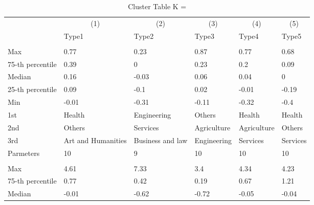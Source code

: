 \begin{table}
\centering
\caption{Cluster Table K = }
\centering
\begin{threeparttable}
\begin{tabular}[t]{llllll}
\toprule
\multicolumn{1}{c}{ } & \multicolumn{1}{c}{(1)} & \multicolumn{1}{c}{(2)} & \multicolumn{1}{c}{(3)} & \multicolumn{1}{c}{(4)} & \multicolumn{1}{c}{(5)} \\
\cmidrule(l{3pt}r{3pt}){2-2} \cmidrule(l{3pt}r{3pt}){3-3} \cmidrule(l{3pt}r{3pt}){4-4} \cmidrule(l{3pt}r{3pt}){5-5} \cmidrule(l{3pt}r{3pt}){6-6}
 & Type1 & Type2 & Type3 & Type4 & Type5\\
\midrule
\addlinespace[0.3em]
\multicolumn{6}{l}{\textit{\textbf{Panel A: }}}\\
\hspace{1em}Max & 0.77 & 0.23 & 0.87 & 0.77 & 0.68\\
\hspace{1em}75-th percentile & 0.39 & 0 & 0.23 & 0.2 & 0.09\\
\hspace{1em}Median & 0.16 & -0.03 & 0.06 & 0.04 & 0\\
\hspace{1em}25-th percentile & 0.09 & -0.1 & 0.02 & -0.01 & -0.19\\
\hspace{1em}Min & -0.01 & -0.31 & -0.11 & -0.32 & -0.4\\
\hspace{1em}1st & Health & Engineering & Others & Health & Health\\
\hspace{1em}2nd & Others & Services & Agriculture & Agriculture & Others\\
\hspace{1em}3rd & Art and Humanities & Business and law & Engineering & Services & Services\\
\hspace{1em}Parmeters & 10 & 9 & 10 & 10 & 10\\
\addlinespace[0.3em]
\multicolumn{6}{l}{\textit{\textbf{Panel B: }}}\\
\hspace{1em}Max & 4.61 & 7.33 & 3.4 & 4.34 & 4.23\\
\hspace{1em}75-th percentile & 0.77 & 0.42 & 0.19 & 0.67 & 1.21\\
\hspace{1em}Median & -0.01 & -0.62 & -0.72 & -0.05 & -0.04\\

\end{tabular}
\end{threeparttable}
\end{table}
